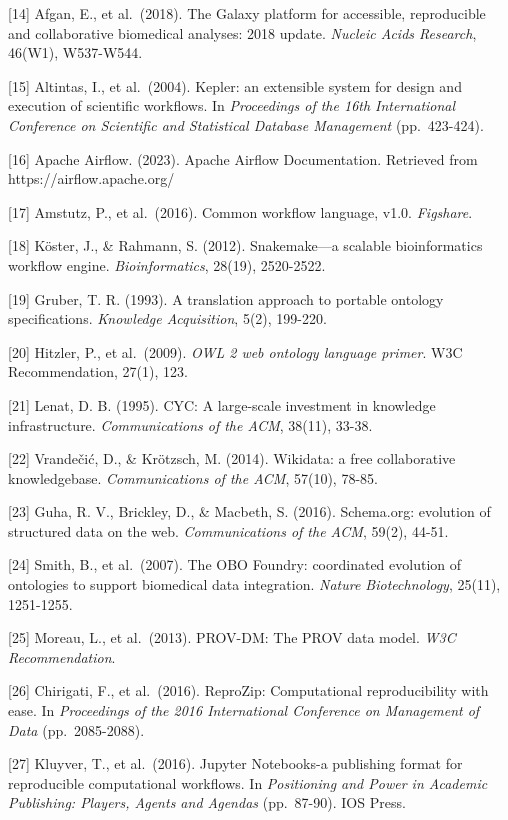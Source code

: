 \documentclass[
]{article}
\begin{document}
{[}14{]} Afgan, E., et al.~(2018). The Galaxy platform for accessible,
reproducible and collaborative biomedical analyses: 2018 update.
\emph{Nucleic Acids Research}, 46(W1), W537-W544.

{[}15{]} Altintas, I., et al.~(2004). Kepler: an extensible system for
design and execution of scientific workflows. In \emph{Proceedings of
the 16th International Conference on Scientific and Statistical Database
Management} (pp.~423-424).

{[}16{]} Apache Airflow. (2023). Apache Airflow Documentation. Retrieved
from https://airflow.apache.org/

{[}17{]} Amstutz, P., et al.~(2016). Common workflow language, v1.0.
\emph{Figshare}.

{[}18{]} Köster, J., \& Rahmann, S. (2012). Snakemake---a scalable
bioinformatics workflow engine. \emph{Bioinformatics}, 28(19),
2520-2522.

{[}19{]} Gruber, T. R. (1993). A translation approach to portable
ontology specifications. \emph{Knowledge Acquisition}, 5(2), 199-220.

{[}20{]} Hitzler, P., et al.~(2009). \emph{OWL 2 web ontology language
primer}. W3C Recommendation, 27(1), 123.

{[}21{]} Lenat, D. B. (1995). CYC: A large-scale investment in knowledge
infrastructure. \emph{Communications of the ACM}, 38(11), 33-38.

{[}22{]} Vrandečić, D., \& Krötzsch, M. (2014). Wikidata: a free
collaborative knowledgebase. \emph{Communications of the ACM}, 57(10),
78-85.

{[}23{]} Guha, R. V., Brickley, D., \& Macbeth, S. (2016). Schema.org:
evolution of structured data on the web. \emph{Communications of the
ACM}, 59(2), 44-51.

{[}24{]} Smith, B., et al.~(2007). The OBO Foundry: coordinated
evolution of ontologies to support biomedical data integration.
\emph{Nature Biotechnology}, 25(11), 1251-1255.

{[}25{]} Moreau, L., et al.~(2013). PROV-DM: The PROV data model.
\emph{W3C Recommendation}.

{[}26{]} Chirigati, F., et al.~(2016). ReproZip: Computational
reproducibility with ease. In \emph{Proceedings of the 2016
International Conference on Management of Data} (pp.~2085-2088).

{[}27{]} Kluyver, T., et al.~(2016). Jupyter Notebooks-a publishing
format for reproducible computational workflows. In \emph{Positioning
and Power in Academic Publishing: Players, Agents and Agendas}
(pp.~87-90). IOS Press.
\end{document}
